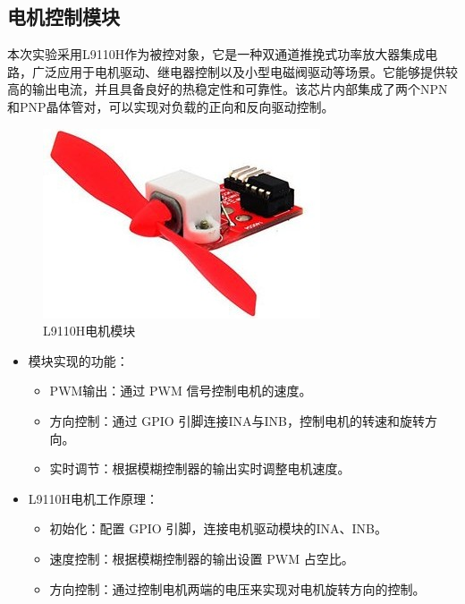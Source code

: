 \documentclass[UTF8]{ctexart}
\begin{document}
\subsection{电机控制模块}
本次实验采用L9110H作为被控对象，它是一种双通道推挽式功率放大器集成电路，广泛应用于电机驱动、继电器控制以及小型电磁阀驱动等场景。它能够提供较高的输出电流，并且具备良好的热稳定性和可靠性。该芯片内部集成了两个NPN和PNP晶体管对，可以实现对负载的正向和反向驱动控制。
\begin{figure}[htbp]
	\centering
	\includegraphics[width=0.21\linewidth]{figure/8}
	\caption{L9110H电机模块} %
	\label{fig:image5} %
\end{figure}\par
\begin{itemize}
	\item 模块实现的功能：
	\begin{itemize}
		\item PWM输出：通过 PWM 信号控制电机的速度。
		\item 方向控制：通过 GPIO 引脚连接INA与INB，控制电机的转速和旋转方向。
		\item 实时调节：根据模糊控制器的输出实时调整电机速度。
	\end{itemize}
	\item L9110H电机工作原理：
	\begin{itemize}
		\item 初始化：配置 GPIO 引脚，连接电机驱动模块的INA、INB。
		\item 速度控制：根据模糊控制器的输出设置 PWM 占空比。
		\item 方向控制：通过控制电机两端的电压来实现对电机旋转方向的控制。
	\end{itemize}
\end{itemize}
\end{document}
